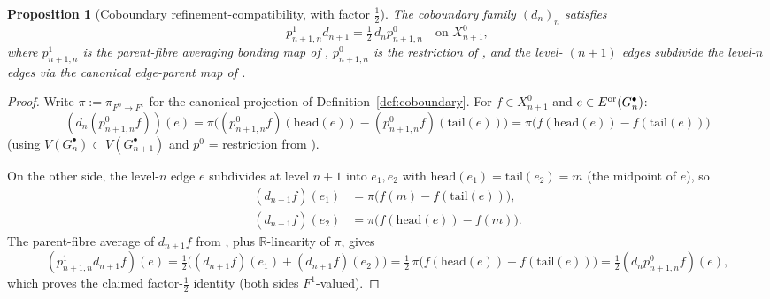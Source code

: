 \documentclass[11pt, a4paper]{amsart}
\newtheorem{proposition}[theorem]{Proposition}
\theoremstyle{definition}
\newcommand{\R}{\mathbb{R}}
\begin{document}
\begin{proposition}[Coboundary refinement-compatibility, with factor $\tfrac{1}{2}$]
\label{prop:coboundary-refinement}
The coboundary family $(d_n)_n$ satisfies
\[
  p_{n+1, n}^1 d_{n+1} = \tfrac{1}{2}\, d_n p_{n+1, n}^0
  \quad \text{on } X_{n+1}^0,
\]
where $p_{n+1, n}^1$ is the parent-fibre averaging bonding map
of \cite[Definition~\texttt{def:p1} (using the edge-parent map of Definition~\texttt{def:edge-parent})]{RefinementSpaces}, $p_{n+1, n}^0$ is the
restriction of \cite[Definition~\texttt{def:p0}]{RefinementSpaces}, and the level-
$(n+1)$ edges subdivide the level-$n$ edges via the canonical
edge-parent map of \cite[Definition~\texttt{def:p1} (using the edge-parent map of Definition~\texttt{def:edge-parent})]{RefinementSpaces}.
\end{proposition}

\begin{proof}
Write $\pi := \pi_{F^0 \to F^1}$ for the canonical projection of
Definition~\ref{def:coboundary}.
For $f \in X_{n+1}^0$ and $e \in E^{\rm or}(G_n^\bullet)$:
\[
  (d_n (p_{n+1, n}^0 f))(e)
  = \pi\bigl((p_{n+1, n}^0 f)(\text{head}(e)) - (p_{n+1, n}^0 f)
    (\text{tail}(e))\bigr)
  = \pi\bigl(f(\text{head}(e)) - f(\text{tail}(e))\bigr)
\]
(using $V(G_n^\bullet) \subset V(G_{n+1}^\bullet)$ and
$p^0$ = restriction from \cite[Definition~\texttt{def:p0}]{RefinementSpaces}).

On the other side, the level-$n$ edge $e$ subdivides at level
$n+1$ into $e_1, e_2$ with $\text{head}(e_1) = \text{tail}(e_2)
= m$ (the midpoint of $e$), so
\begin{align*}
  (d_{n+1} f)(e_1) &= \pi\bigl(f(m) - f(\text{tail}(e))\bigr), \\
  (d_{n+1} f)(e_2) &= \pi\bigl(f(\text{head}(e)) - f(m)\bigr).
\end{align*}
The parent-fibre average of $d_{n+1} f$ from
\cite[Definition~\texttt{def:p1} (using the edge-parent map of Definition~\texttt{def:edge-parent})]{RefinementSpaces}, plus
$\R$-linearity of $\pi$, gives
\[
  (p_{n+1, n}^1 d_{n+1} f)(e)
  = \tfrac{1}{2}\bigl((d_{n+1} f)(e_1) + (d_{n+1} f)(e_2)\bigr)
  = \tfrac{1}{2}\, \pi\bigl(f(\text{head}(e)) - f(\text{tail}(e))\bigr)
  = \tfrac{1}{2} (d_n p_{n+1, n}^0 f)(e),
\]
which proves the claimed factor-$\tfrac{1}{2}$ identity (both
sides $F^1$-valued).
\end{proof}
\end{document}
